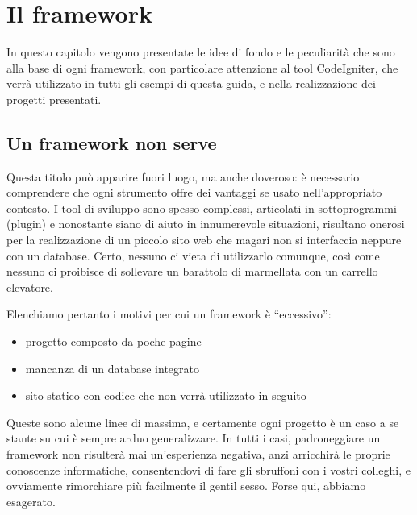 \chapter{Il framework}
In questo capitolo vengono presentate le idee di fondo e le peculiarità che sono alla base di ogni framework, con particolare attenzione al tool CodeIgniter, che verrà utilizzato in tutti gli esempi di questa guida, e nella realizzazione dei progetti presentati.

\section{Un framework non serve}
Questa titolo può apparire fuori luogo, ma anche doveroso: è necessario comprendere che ogni strumento offre dei vantaggi se usato nell'appropriato contesto. I tool di sviluppo sono spesso complessi, articolati in sottoprogrammi (plugin) e nonostante siano di aiuto in innumerevole situazioni, risultano onerosi per la realizzazione di un piccolo sito web che magari non si interfaccia neppure con un database. Certo, nessuno ci vieta di utilizzarlo comunque, così come nessuno ci proibisce di sollevare un barattolo di marmellata con un carrello elevatore. 

Elenchiamo pertanto i motivi per cui un framework è ``eccessivo'':

\label{sec:svantaggi}
\begin{itemize}
\item progetto composto da poche pagine
\item mancanza di un database integrato
\item sito statico con codice che non verrà utilizzato in seguito
\end{itemize}

Queste sono alcune linee di massima, e certamente ogni progetto è un caso a se stante su cui è sempre arduo generalizzare. In tutti i casi, padroneggiare un framework non risulterà mai un'esperienza negativa, anzi arricchirà le proprie conoscenze informatiche, consentendovi di fare gli sbruffoni con i vostri colleghi, e ovviamente rimorchiare più facilmente il gentil sesso. Forse qui, abbiamo esagerato.

\label{sec:vantaggi}
